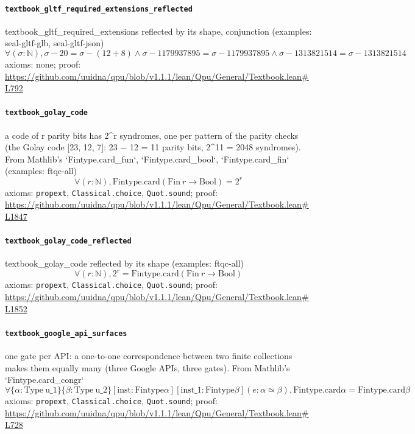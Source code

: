 \documentclass[11pt]{article}
\begin{document}
\paragraph{\texttt{textbook\_gltf\_required\_extensions\_reflected}}
textbook\_gltf\_required\_extensions reflected by its shape, conjunction (examples: seal-gltf-glb, seal-gltf-json)
\[ \forall (\sigma : \mathbb{N}), \sigma - 20 = \sigma - (12 + 8) \land \sigma - 1179937895 = \sigma - 1179937895 \land \sigma - 1313821514 = \sigma - 1313821514 \]
\noindent axioms: none; proof: \url{https://github.com/uuidna/qpu/blob/v1.1.1/lean/Qpu/General/Textbook.lean\#L792}

\paragraph{\texttt{textbook\_golay\_code}}
a code of r parity bits has 2\^{}r syndromes, one per pattern of the parity checks (the Golay code [23, 12, 7]: 23 − 12 = 11 parity bits, 2\^{}11 = 2048 syndromes). From Mathlib's `Fintype.card\_fun`, `Fintype.card\_bool`, `Fintype.card\_fin` (examples: ftqc-all)
\[ \forall (r : \mathbb{N}), \mathrm{Fintype.card} (\mathrm{Fin}\ r \to \mathrm{Bool}) = 2 ^{r} \]
\noindent axioms: \texttt{propext}, \texttt{Classical.choice}, \texttt{Quot.sound}; proof: \url{https://github.com/uuidna/qpu/blob/v1.1.1/lean/Qpu/General/Textbook.lean\#L1847}

\paragraph{\texttt{textbook\_golay\_code\_reflected}}
textbook\_golay\_code reflected by its shape (examples: ftqc-all)
\[ \forall (r : \mathbb{N}), 2 ^{r} = \mathrm{Fintype.card} (\mathrm{Fin}\ r \to \mathrm{Bool}) \]
\noindent axioms: \texttt{propext}, \texttt{Classical.choice}, \texttt{Quot.sound}; proof: \url{https://github.com/uuidna/qpu/blob/v1.1.1/lean/Qpu/General/Textbook.lean\#L1852}

\paragraph{\texttt{textbook\_google\_api\_surfaces}}
one gate per API: a one-to-one correspondence between two finite collections makes them equally many (three Google APIs, three gates). From Mathlib's `Fintype.card\_congr`
\[ \forall \{\alpha : \mathrm{Type}\ \mathrm{u\_1}\} \{\beta : \mathrm{Type}\ \mathrm{u\_2}\} [\mathrm{inst} : \mathrm{Fintype} \alpha ] [\mathrm{inst\_1} : \mathrm{Fintype} \beta ] (e : \alpha \simeq \beta ), \mathrm{Fintype.card} \alpha = \mathrm{Fintype.card} \beta  \]
\noindent axioms: \texttt{propext}, \texttt{Classical.choice}, \texttt{Quot.sound}; proof: \url{https://github.com/uuidna/qpu/blob/v1.1.1/lean/Qpu/General/Textbook.lean\#L728}
\end{document}
